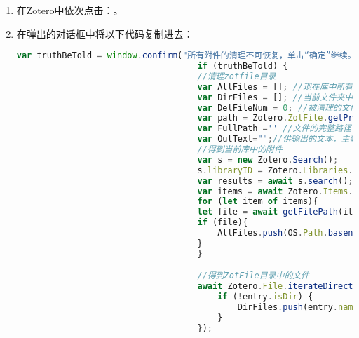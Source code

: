\documentclass[cn,11pt,chinese]{elegantbook}
\begin{document}
			\begin{enumerate}
				\item 在Zotero中依次点击：。
				\item 在弹出的对话框中将以下代码复制进去：
								\begin{lstlisting}[language=JavaScript]
									var truthBeTold = window.confirm("所有附件的清理不可恢复，单击“确定”继续。单击“取消”停止。")
									if (truthBeTold) {
									//清理zotfile目录
									var AllFiles = []; //现在库中所有的文件
									var DirFiles = []; //当前文件夹中的文件
									var DelFileNum = 0; //被清理的文件个数
									var path = Zotero.ZotFile.getPref("dest_dir")   //得到zotfile目录
									var FullPath ='' //文件的完整路径
									var OutText="";//供输出的文本，主要用于换行
									//得到当前库中的附件
									var s = new Zotero.Search();
									s.libraryID = Zotero.Libraries.userLibraryID;
									var results = await s.search();
									var items = await Zotero.Items.getAsync(results);
									for (let item of items){
									let file = await getFilePath(item);
									if (file){
										AllFiles.push(OS.Path.basename(file));//只存入文件名
									}
									}

									//得到ZotFile目录中的文件
									await Zotero.File.iterateDirectory(path, async function(entry){
										if (!entry.isDir) {
											DirFiles.push(entry.name);
										}
									});


\end{lstlisting}
\end{enumerate}
\end{document}
